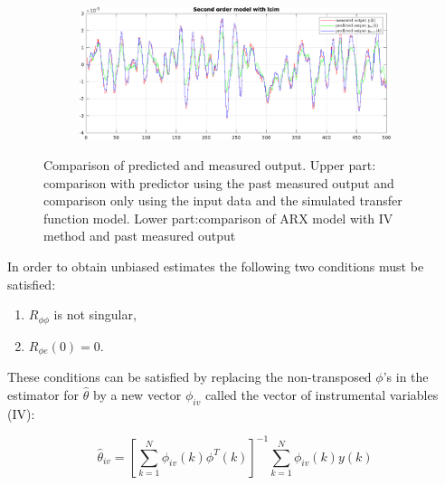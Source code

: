 \documentclass{scrartcl}
\begin{document}
\begin{figure}[h]
\begin{subfigure}{.49\textwidth}
		\label{fig:output_lsim2}
	\end{subfigure}
	\begin{subfigure}{\textwidth}
		\vspace*{1cm}
		\includegraphics[width=\textwidth]{figures/arx_iv.pdf}

	\end{subfigure}
	\caption{Comparison of predicted and measured output. Upper part: comparison with predictor using the past measured output and comparison only using the input data and the simulated transfer function model. Lower part:comparison of ARX model with IV method and past measured output}
\end{figure}

In order to obtain unbiased estimates the following two conditions must be satisfied: 

\begin{enumerate}
\item $R_{\phi \phi}$ is not singular,
\item $R_{\phi e }(0) = 0$.
\end{enumerate}

These conditions can be satisfied by replacing the non-transposed $\phi$'s in the estimator for $\hat{\theta}$ by a new vector $\phi_{iv}$ called the vector of  instrumental variables (IV):

\begin{equation}
\hat{\theta}_{iv} = \left[ \sum\limits_{k=1}^N \phi_{iv}(k)\phi^T(k) \right]^{-1} \sum\limits_{k=1}^N 
\phi_{iv}(k) y(k)
\end{equation}
\end{document}
